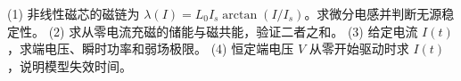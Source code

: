 (1) 非线性磁芯的磁链为 \(\lambda(I)=L_0I_s\arctan(I/I_s)\)。求微分电感并判断无源稳定性。
(2) 求从零电流充磁的储能与磁共能，验证二者之和。
(3) 给定电流 \(I(t)\)，求端电压、瞬时功率和弱场极限。
(4) 恒定端电压 \(V\) 从零开始驱动时求 \(I(t)\)，说明模型失效时间。
